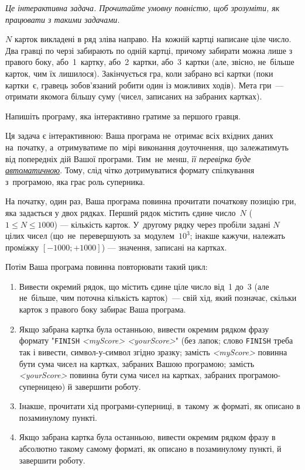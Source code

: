 ﻿{\it Це інтерактивна задача. Прочитайте умовну повністю, щоб зрозуміти, як працювати з такими задачами.}

$N$ карток викладені в ряд зліва направо. На~кожній картці написане ціле число. Два гравці по черзі забирають по одній картці, причому забирати можна лише з правого боку, або~1~картку, або~2~картки, або~3~картки (але, звісно, не~більше карток, чим їх лишилося). Закінчується гра, коли забрано всі картки (поки картки~є, гравець зобов'язаний робити один із можливих ходів). Мета гри~--- отримати якомога більшу суму (чисел, записаних на забраних картках).

Напишіть програму, яка інтерактивно гратиме за першого гравця. 

Ця задача є інтерактивною: 
Ваша програма не~отримає всіх вхідних даних на~початку,
а~отримуватиме по~мірі виконання доуточнення, 
що залежатимуть від попередніх дій Вашої програми. 
Тим~не~менш, {\it її перевірка буде
\underline{автоматичною}}. 
Тому, слід чітко дотримуватися формату спілкування з~програмою, яка грає роль суперника.


\Interaction

На початку, один раз, Ваша програма повинна прочитати початкову позицію гри, яка задається у двох рядках.
Перший рядок містить єдине число~$N$ ($1\leqslant N\leqslant 1000$) --- кількість карток.
У~другому рядку через пробіли задані $N$ цілих чисел (що~не~перевершують за~модулем~$10^3$; інакше кажучи, належать проміжку $[-1000; +1000]$) --- значення, записані на картках.

Потім Ваша програма повинна повторювати такий цикл:
\begin{enumerate}
\item
Вивести окремий рядок, що містить єдине ціле число від~1 до~3 (але не~більше, чим поточна кількість карток)~--- свій хід, який позначає, скільки карток з правого боку забирає Ваша програма.

\item
Якщо забрана картка була останньою, 
вивести окремим рядком фразу формату "\texttt{FINISH} {\it <myScore> <yourScore>}"
(без лапок; 
слово \texttt{FINISH} треба так і вивести, символ-у-символ згідно зразку;
замість {\it <myScore>} повинна бути сума чисел на картках, забраних Вашою програмою;
замість {\it <yourScore>} повинна бути сума чисел на картках, забраних програмою-суперницею) 
й завершити роботу.

\item
Інакше, прочитати хід програми-суперниці, в~такому~ж форматі, як описано в позаминулому пункті.

\item
Якщо забрана картка була останньою, 
вивести окремим рядком фразу в абсолютно такому самому форматі, як описано в позаминулому пункті, й завершити роботу.
\end{enumerate}

